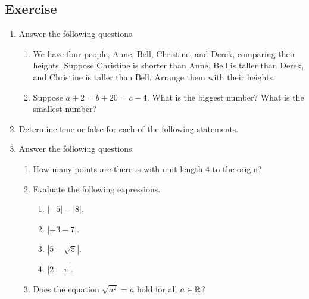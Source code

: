 \documentclass[11pt]{book}
\begin{document}
\subsection*{Exercise}
\begin{enumerate}[label=\arabic*.]
    \item Answer the following questions.
    \begin{enumerate}
        \item We have four people, Anne, Bell, Christine, and Derek, comparing their heights. Suppose Christine is shorter than Anne, Bell is taller than Derek, and Christine is taller than Bell. Arrange them with their heights.
        \item Suppose $a+2=b+20=c-4$. What is the biggest number? What is the smallest number?
    \end{enumerate}
    \item Determine true or false for each of the following statements.
    \begin{enumerate}
    \end{enumerate}
    \item Answer the following questions.
    \begin{enumerate}
        \item How many points are there is with unit length $4$ to the origin?
        \item Evaluate the following expressions.
        \begin{multicols}{4}
            \begin{enumerate}[label=\alph*.]
                \item $|-5|-|8|$.
                \item $|-3-7|$.
                \item $|5-\sqrt{5}|$.
                \item $|2-\pi|$.
            \end{enumerate}
        \end{multicols}
        \item Does the equation $\sqrt{a^2}=a$ hold for all $a\in\mathbb{R}$?

\end{enumerate}
\end{enumerate}
\end{document}
